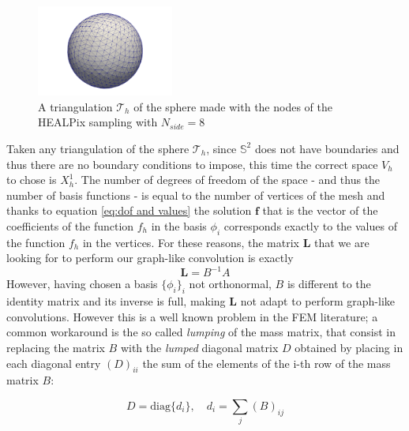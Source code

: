 \begin{figure}[h]
	\begin{center}
		\includegraphics[width=0.4\textwidth]{figs/Chapter3/sphere_mesh.png}
	\end{center}
	\caption{\label{fig:sphere mesh}A triangulation $\mathcal T_h$ of the sphere made with the nodes of the HEALPix sampling with $N_{side}=8$}
\end{figure}

Taken any triangulation of the sphere $\mathcal T_h$, since $\mathbb S^2$ does not have boundaries and thus there are no boundary conditions to impose, this time the correct space $V_h$ to chose is $X^1_h$. The number of degrees of freedom of the space - and thus the number of basis functions - is equal to the number of vertices of the mesh and thanks to equation \ref{eq:dof and values} the solution $\mathbf f$ that is the vector of the coefficients of the function $f_h$ in the basis $\phi_i$ corresponds exactly to the values of the function $f_h$ in the vertices. For these reasons, the matrix $\mathbf L$ that we are looking for to perform our graph-like convolution is exactly
$$
\mathbf L = B^{-1}A
$$
However, having chosen a basis $\{\phi_i\}_i$ not orthonormal, $B$ is different to the identity matrix and its inverse is full, making $\mathbf L$ not adapt to perform graph-like convolutions. However this is a well known problem in the FEM literature; a common workaround is the so called \textit{lumping} of the mass matrix, that consist in replacing the matrix $B$ with the \textit{lumped} diagonal matrix $D$ obtained by placing in each diagonal entry $(D)_{ii}$ the sum of the elements of the i-th row of the mass matrix $B$:

\begin{equation}\label{eq:lumping}
D = \text{diag}\{d_i\},\quad d_i = \sum_j (B)_{ij}
\end{equation}

